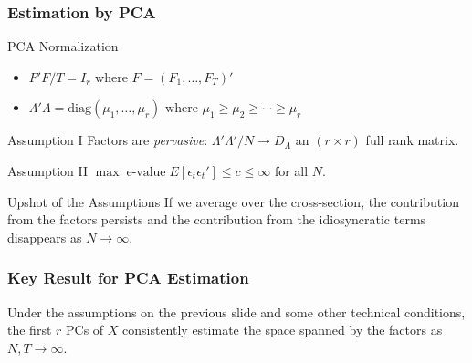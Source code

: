 \documentclass[handout]{beamer}
\begin{document}
\begin{frame}
\frametitle{Estimation by PCA}

\begin{block}
	{PCA Normalization}
		\begin{itemize}
			\item $F'F/T = I_r$ where $F = (F_1, \hdots, F_T)'$
			\item $\Lambda' \Lambda =\mbox{diag}(\mu_1, \hdots, \mu_r)$ where $\mu_1 \geq \mu_2 \geq \cdots \geq \mu_r$
		\end{itemize}
\end{block}
	
\begin{block}
	{Assumption I}
	Factors are \emph{pervasive}: $\Lambda' \Lambda'/N \rightarrow D_\Lambda$ an $(r\times r)$ full rank matrix.
\end{block}

\begin{block}
	{Assumption II}
	$\max \;\mbox{e-value}\; E[\epsilon_t\epsilon_t']\leq c \leq \infty$ for all $N$.
\end{block}

\begin{block}
	{Upshot of the Assumptions}
If we average over the cross-section, the contribution from the factors persists and the contribution from the idiosyncratic terms disappears as $N\rightarrow \infty$.
\end{block}

\end{frame}
\begin{frame}
	\frametitle{Key Result for PCA Estimation}
	Under the assumptions on the previous slide and some other technical conditions, the first $r$ PCs of $X$ consistently estimate the space spanned by the factors as $N,T \rightarrow \infty$.
\end{frame}
\end{document}
